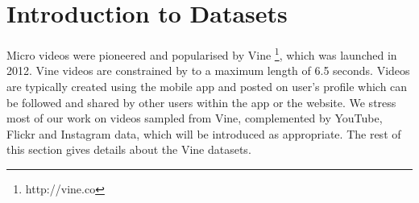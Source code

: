 \section{Introduction to Datasets}
Micro videos were pioneered and popularised by Vine \footnote{\scriptsize http://vine.co}, which was launched in 2012. Vine videos are constrained by to a maximum length of 6.5 seconds. Videos are typically created using the mobile app and posted on user's profile which can be followed and shared by other users within the app or the website. %
We stress most of our work on videos sampled from Vine, complemented by YouTube, Flickr and Instagram data, which will be introduced as appropriate. The rest of this section gives details about the Vine datasets.
%
%

